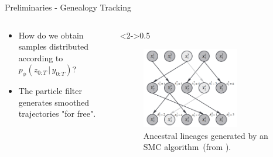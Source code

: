 \documentclass[10pt, aspectratio=1610]{beamer}
\newcommand{\given}{\,|\,}
\begin{document}
  \begin{frame}{Preliminaries - Genealogy Tracking}
    \begin{columns}
      \begin{column}{0.5\textwidth}
        \begin{itemize}
          \item<1-> How do we obtain samples distributed according to $p_\phi(z_{0:T} \given y_{0:T})$?
          \item<2-> The particle filter generates smoothed trajectories "for free".
          \vspace{1cm}
        \end{itemize}          
      \end{column}
      \begin{column}<2->{0.5\textwidth}
        \begin{figure}[htbp]
          \centering
          \includegraphics[width=0.7\textwidth]{figures/genealogy_tracking.png}
          \caption{Ancestral lineages generated by an SMC algorithm~(from \citet{andrieu2010particle}).}
        \end{figure}
      \end{column}
    \end{columns}
  \end{frame}
\end{document}
